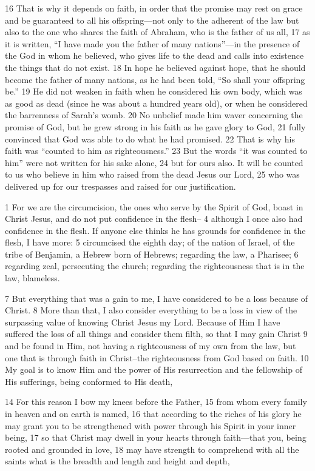 \begin{bible}
16 That is why it depends on faith, in order that the promise may rest on grace and be guaranteed to all his offspring—not only to the adherent of the law but also to the one who shares the faith of Abraham, who is the father of us all, 17 as it is written, ``I have made you the father of many nations''—in the presence of the God in whom he believed, who gives life to the dead and calls into existence the things that do not exist. 18 In hope he believed against hope, that he should become the father of many nations, as he had been told, ``So shall your offspring be.'' 19 He did not weaken in faith when he considered his own body, which was as good as dead (since he was about a hundred years old), or when he considered the barrenness of Sarah's womb. 20 No unbelief made him waver concerning the promise of God, but he grew strong in his faith as he gave glory to God, 21 fully convinced that God was able to do what he had promised. 22 That is why his faith was ``counted to him as righteousness.'' 23 But the words ``it was counted to him'' were not written for his sake alone, 24 but for ours also. It will be counted to us who believe in him who raised from the dead Jesus our Lord, 25 who was delivered up for our trespasses and raised for our justification.

1 For we are the circumcision, the ones who serve by the Spirit of God, boast in Christ Jesus, and do not put confidence in the flesh-- 4 although I once also had confidence in the flesh. If anyone else thinks he has grounds for confidence in the flesh, I have more: 5 circumcised the eighth day; of the nation of Israel, of the tribe of Benjamin, a Hebrew born of Hebrews; regarding the law, a Pharisee; 6 regarding zeal, persecuting the church; regarding the righteousness that is in the law, blameless.

7 But everything that was a gain to me, I have considered to be a loss because of Christ. 8 More than that, I also consider everything to be a loss in view of the surpassing value of knowing Christ Jesus my Lord. Because of Him I have suffered the loss of all things and consider them filth, so that I may gain Christ 9 and be found in Him, not having a righteousness of my own from the law, but one that is through faith in Christ--the righteousness from God based on faith. 10 My goal is to know Him and the power of His resurrection and the fellowship of His sufferings, being conformed to His death,

14 For this reason I bow my knees before the Father, 15 from whom every family in heaven and on earth is named, 16 that according to the riches of his glory he may grant you to be strengthened with power through his Spirit in your inner being, 17 so that Christ may dwell in your hearts through faith—that you, being rooted and grounded in love, 18 may have strength to comprehend with all the saints what is the breadth and length and height and depth,


\end{bible}

